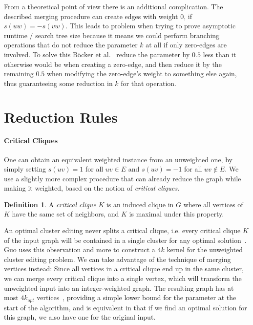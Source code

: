 \documentclass[12pt,oneside,english,parskip=full,headings=small]{scrbook}
\theoremstyle{definition}
\newtheorem{definition}[theorem]{Definition}
\begin{document}
From a theoretical point of view there is an additional complication. The described merging
procedure can create edges with weight $0$, if $s(uw) = -s(vw)$. This leads to problem when trying
to prove asymptotic runtime / search tree size because it means we could perform branching
operations that do not reduce the parameter $k$ at all if only zero-edges are involved. To solve
this Böcker et al.~\cite{GoingWeighted} reduce the parameter by $0.5$ less than it otherwise would
be when creating a zero-edge, and then reduce it by the remaining $0.5$ when modifying the
zero-edge's weight to something else again, thus guaranteeing some reduction in $k$ for that
operation.

\section{Reduction Rules}
\label{sec:reduction}

\paragraph{Critical Cliques} One can obtain an equivalent weighted instance from an unweighted one,
by simply setting $s(uv) = 1$ for all $uv \in E$ and $s(uv) = -1$ for all $uv \notin E$. We use a
slightly more complex procedure that can already reduce the graph while making it weighted, based on
the notion of \emph{critical cliques}.

\begin{definition}
	A \emph{critical clique} $K$ is an induced clique in $G$ where all vertices of $K$ have the same
	set of neighbors, and $K$ is maximal under this property. 
\end{definition}

An optimal cluster editing never splits a critical clique, i.e. every critical clique $K$ of the
input graph will be contained in a single cluster for any optimal solution~\cite{Guo}. Guo uses this
observation and more to construct a $4k$ kernel for the unweighted cluster editing problem. We can
take advantage of the technique of merging vertices instead: Since all vertices in a critical clique
end up in the same cluster, we can merge every critical clique into a single vertex, which will
transform the unweighted input into an integer-weighted graph. The resulting graph has at most
$4k_{opt}$ vertices~\cite{GoingWeighted, Guo}, providing a simple lower bound for the parameter at
the start of the algorithm, and is equivalent in that if we find an optimal solution for this graph,
we also have one for the original input.
\end{document}
